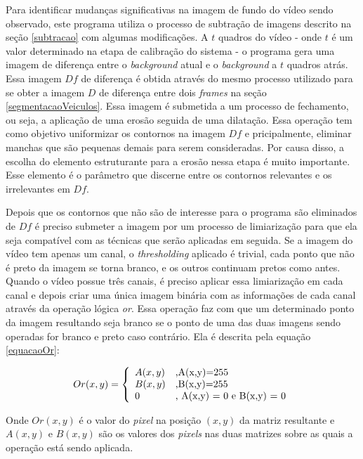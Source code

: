    Para identificar mudanças significativas na imagem de fundo do vídeo sendo observado, este programa utiliza o processo de subtração de imagens descrito na seção \ref{subtracao} com algumas modificações. A $t$ quadros do vídeo - onde $t$ é um valor determinado na etapa de calibração do sistema - o programa gera uma imagem de diferença entre o \textit{background} atual e o \textit{background} a $t$ quadros atrás. Essa imagem $Df$ de diferença é obtida através do mesmo processo utilizado para se obter a imagem $D$ de diferença entre dois \textit{frames} na seção \ref{segmentacaoVeiculos}. Essa imagem é submetida a um processo de fechamento, ou seja, a aplicação de uma erosão seguida de uma dilatação. Essa operação tem como objetivo uniformizar os contornos na imagem $Df$ e pricipalmente, eliminar manchas que são pequenas demais para serem consideradas. Por causa disso, a escolha do elemento estruturante para a erosão nessa etapa é muito importante. Esse elemento é o parâmetro que discerne entre os contornos relevantes e os irrelevantes em $Df$.

    Depois que os contornos que não são de interesse para o programa são eliminados de $Df$ é preciso submeter a imagem por um processo de limiarização para que ela seja compatível com as técnicas que serão aplicadas em seguida. Se a imagem do vídeo tem apenas um canal, o \textit{thresholding} aplicado é trivial, cada ponto que não é preto da imagem se torna branco, e os outros continuam pretos como antes. Quando o vídeo possue três canais, é preciso aplicar essa limiarização em cada canal e depois criar uma única imagem binária com as informações de cada canal através da operação lógica \textit{or}. Essa operação faz com que um determinado ponto da imagem resultando seja branco se o ponto de uma das duas imagens sendo operadas for branco e preto caso contrário. Ela é descrita pela equação \ref{equacaoOr}:


    \begin{equation}\label{equacaoOr}
       Or(x,y) = \left\{
        \begin{array}{l l}
        A(x,y) & \text{,A(x,y)=255} \\
        B(x,y) & \text{,B(x,y)=255}\\
        0 & \text{, A(x,y) = 0 e B(x,y) = 0} \\
         \end{array} \right.
     \end{equation}

     Onde $Or(x,y)$ é o valor do \textit{pixel} na posição $(x,y)$ da matriz resultante e $A(x,y)$ e $B(x,y)$ são os valores dos \textit{pixels} nas duas matrizes sobre as quais a operação está sendo aplicada.

